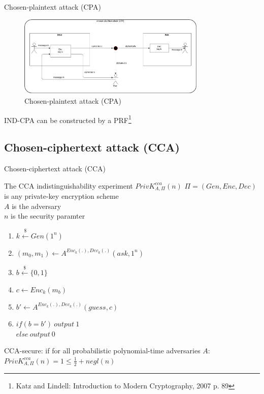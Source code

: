 \documentclass[ucs,9pt]{beamer}
\begin{document}
\begin{frame}{Chosen-plaintext attack (CPA)}
    
    \begin{figure}[h]
        \centering
        \includegraphics[width=0.8\textwidth]{figures/CPA.png}
        \caption{Chosen-plaintext attack (CPA)}
    \end{figure}
    IND-CPA can be constructed by a PRF\footnote{Katz and Lindell: Introduction to Modern Cryptography, 2007 p. 89}
\end{frame}



\subsection{Chosen-ciphertext attack (CCA)}
\begin{frame}{Chosen-ciphertext attack (CCA)}
    \begin{block}{The CCA indistinguishability experiment $ PrivK_{A,\Pi}^{cca}(n) $}
        $\Pi = (Gen, Enc, Dec)$ is any private-key encryption scheme\\
        $A$ is the adversary\\
        $n$ is the security paramter\\
        \begin{enumerate}
            \item $k \overset{\$}{\leftarrow} Gen(1^n)$
            \item $(m_{0},m_{1}) \leftarrow A^{Enc_{k}(.), Dec_{k}(.)}(ask, 1^{n})$
            \item $b \overset{\$}{\leftarrow} \{0, 1\}$
            \item $c \leftarrow Enc_{k}(m_{b})$
            \item $b' \leftarrow A^{Enc_{k}(.), Dec_{k}(.)}(guess, c)$
            \item $if(b = b')\ output\ 1$ \\
            $else\ output\ 0$
        \end{enumerate}
        CCA-secure: if for all probabilistic polynomial-time adversaries $A$:\\
        $ PrivK_{A,\Pi}^{cca}(n) = 1 \leq \frac{1}{2} + negl(n) $
    \end{block}
\end{frame}
\end{document}
